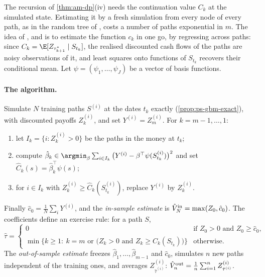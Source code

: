 The recursion of \cref{thm:am-dp}(iv) needs the continuation value $C_k$ at the simulated
state. Estimating it by a fresh simulation from every node of every path, as in the random
tree of \textcite{broadie-glasserman-tree}, costs a number of paths exponential in $m$.
The idea of \textcite{carriere}, \textcite{tsitsiklis-vanroy} and
\textcite{longstaff-schwartz} is to estimate the function $c_k$ in one go, by regressing
across paths: since $C_k=\E[Z_{\tau^*_{k+1}}\mid S_{t_k}]$, the realised discounted cash
flows of the paths are noisy observations of it, and least squares onto functions of
$S_{t_k}$ recovers their conditional mean. Let $\psi=(\psi_1,\dots,\psi_J)$ be a vector of
basis functions.

\paragraph{The algorithm.} Simulate $N$ training paths $S^{(i)}$ at the dates $t_k$ exactly
(\cref{prop:ps-gbm-exact}), with discounted payoffs $Z^{(i)}_k$, and set
$Y^{(i)}=Z^{(i)}_m$. For $k=m-1,\dots,1$:
\begin{enumerate}[label=(\arabic*)]
  \item let $I_k=\{i:Z^{(i)}_k>0\}$ be the paths in the money at $t_k$;
  \item compute $\hat\beta_k\in\argmin_\beta\sum_{i\in I_k}\big(Y^{(i)}-\beta^\top\psi(S^{(i)}_{t_k})\big)^2$
    and set $\hat C_k(s)=\hat\beta_k^\top\psi(s)$;
  \item for $i\in I_k$ with $Z^{(i)}_k\ge\hat C_k(S^{(i)}_{t_k})$, replace $Y^{(i)}$ by
    $Z^{(i)}_k$.
\end{enumerate}
Finally $\hat c_0=\frac1N\sum_iY^{(i)}$, and the \emph{in-sample estimate} is
$\hat V^{\rm in}_N=\max(Z_0,\hat c_0)$. The coefficients define an exercise rule: for a
path $S$,
\begin{equation}\label{eq:am-rule}
  \hat\tau=\begin{cases}0&\text{if }Z_0>0\text{ and }Z_0\ge\hat c_0,\\
  \min\big\{k\ge1:\ k=m\text{ or }\big(Z_k>0\text{ and }Z_k\ge\hat C_k(S_{t_k})\big)\big\}&\text{otherwise.}\end{cases}
\end{equation}
The \emph{out-of-sample estimate} freezes $\hat\beta_1,\dots,\hat\beta_{m-1}$ and $\hat c_0$,
simulates $n$ new paths independent of the training ones, and averages
$Z^{(i)}_{\hat\tau^{(i)}}$: $\hat V^{\rm out}_n=\frac1n\sum_{i=1}^nZ^{(i)}_{\hat\tau^{(i)}}$.

